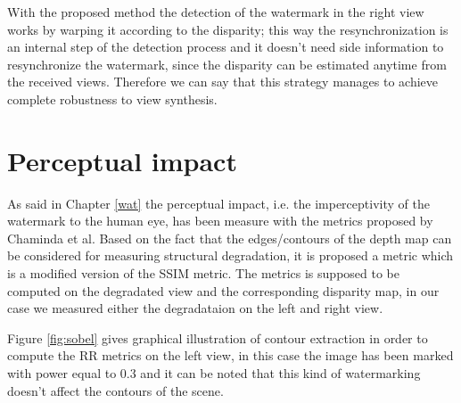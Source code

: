 With the proposed method the detection of the watermark in the right view works by warping it according to the disparity; this way the resynchronization is an internal step of the detection process and it doesn't need side information to resynchronize the watermark, since the disparity can be estimated anytime from the received views.
\newline Therefore we can say that this strategy manages to achieve complete robustness to view synthesis.
\clearpage
\section{Perceptual impact}

As said in Chapter \ref{wat} the perceptual impact, i.e. the imperceptivity of the watermark to the human eye, has been measure with the metrics proposed by Chaminda et al.
Based on the fact that the edges/contours of the depth map can be considered for measuring structural degradation, it is proposed a metric which is a modified version of the SSIM metric. The metrics is supposed to be computed on the degradated view and the corresponding disparity map, in our case we measured either the degradataion on the left and right view.

Figure \ref{fig:sobel} gives graphical illustration of contour extraction in order to compute the RR metrics on the left view, in this case the image has been marked with power equal to 0.3 and it can be noted that this kind of watermarking doesn't affect the contours of the scene.
   


